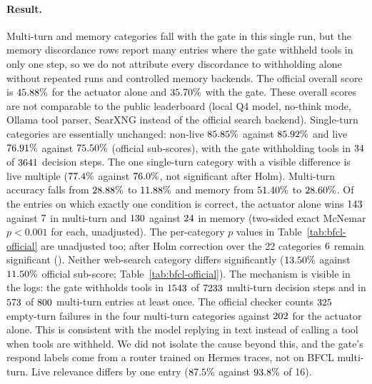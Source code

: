 \documentclass[10pt,twocolumn,letterpaper]{article}
\begin{document}
\paragraph{Result.} Multi-turn and memory categories fall with the gate in this single run, but the memory discordance rows report many entries where the gate withheld tools in only one step, so we do not attribute every discordance to withholding alone without repeated runs and controlled memory backends. The official overall score is $45.88\%$ for the actuator alone and $35.70\%$ with the gate. These overall scores are not comparable to the public leaderboard (local Q4 model, no-think mode, Ollama tool parser, SearXNG instead of the official search backend). Single-turn categories are essentially unchanged: non-live $85.85\%$ against $85.92\%$ and live $76.91\%$ against $75.50\%$ (official sub-scores), with the gate withholding tools in $34$ of $3641$ decision steps. The one single-turn category with a visible difference is live multiple ($77.4\%$ against $76.0\%$, not significant after Holm). Multi-turn accuracy falls from $28.88\%$ to $11.88\%$ and memory from $51.40\%$ to $28.60\%$. Of the entries on which exactly one condition is correct, the actuator alone wins $143$ against $7$ in multi-turn and $130$ against $24$ in memory (two-sided exact McNemar $p<0.001$ for each, unadjusted). The per-category $p$ values in Table~\ref{tab:bfcl-official} are unadjusted too; after Holm correction over the 22 categories $6$ remain significant (\bfHolmList{}). Neither web-search category differs significantly ($13.50\%$ against $11.50\%$ official sub-score; Table~\ref{tab:bfcl-official}). The mechanism is visible in the logs: the gate withholds tools in $1543$ of $7233$ multi-turn decision steps and in $573$ of $800$ multi-turn entries at least once. The official checker counts $325$ empty-turn failures in the four multi-turn categories against $202$ for the actuator alone. This is consistent with the model replying in text instead of calling a tool when tools are withheld. We did not isolate the cause beyond this, and the gate's respond labels come from a router trained on Hermes traces, not on BFCL multi-turn. Live relevance differs by one entry ($87.5\%$ against $93.8\%$ of 16).
\end{document}
